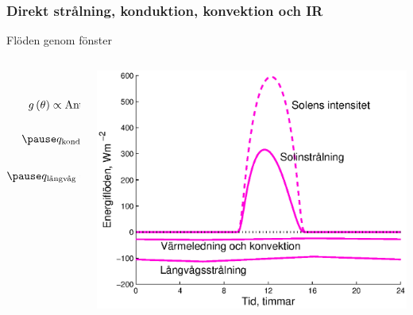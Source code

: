 \subsubsection{Direkt strålning, konduktion, konvektion och IR}
\begin{frame}{Flöden genom fönster}
  \begin{columns}
    \begin{column}{.48\textwidth}
      {\small
      \begin{eqnarray*}
        q_{\text{sol}} =  g\left( \theta \right) \cdot I_0 \cos{\left( \theta \right)}\\[10pt]
        g\left( \theta \right) \propto \text{Antal rutor \& beläggningar}\\[10pt]
        \pause q_{\text{kond}} = \frac{1}{\frac{1}{U}+\frac{1}{h}} \left( T_{inne} - T_{ute}\right)\\[10pt]
        \pause q_{\text{långvåg}} = 0,75 \cdot \sigma \left( T_{inne}^4 - T_{ute}^4\right)
      \end{eqnarray*}
      }
    \end{column}


    \begin{column}{.5\textwidth}
      \pause
      \vspace{-30pt}
      \begin{center}
        \includegraphics[scale=0.4]{images/windows_flow.eps}
      \end{center}
    \end{column}
  \end{columns}
\end{frame}
